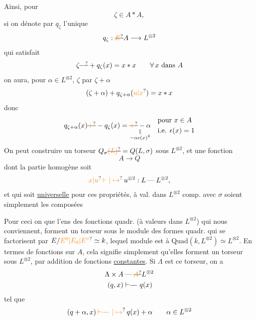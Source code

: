 Ainsi,  pour 
\[
\zeta\in A*A,
\]
si on dénote par $q_\zeta$ l'unique  
 
\[
q_\zeta:\deleted{\unsure{E}}A\longrightarrow L^{\otimes 2}
\]
qui satisfait
\[
\zeta\deleted{\unsure{-}}+q_\zeta(x)=x*x\qquad \forall\,x\text{ dans }A
\]
on aura, pour $\alpha\in L^{\otimes 2}$, 
$\zeta$ par $\zeta+\alpha$
\[
(\zeta+\alpha)+q_{\zeta+\alpha}(\unsure{u|x})=x*x
\]
donc
\[
q_{\zeta+\alpha}(x)\deleted{\unsure{+}}-q_\zeta(x)=
\underset{\substack{\Vert\\-\alpha\epsilon(x)^2}}{\deleted{\unsure{+}}-\alpha}
\quad\begin{aligned}&\text{pour }x\in A\\&\text{i.e. }\epsilon(x)=1\end{aligned}
\]
On peut construire un torseur
$Q_{\sigma}\deleted{\unsure{(L)}}=Q(L,\sigma)$ sous $L^{\otimes 2}$, et une fonction
\[
A\longrightarrow Q
\]
dont la partie homogène soit
\[
\unsure{x|u}\,\unsure{\vdash|\mapsto}\,u^{\otimes 2}:L\mathbin{\text{---}}L^{\otimes 2},
\]
et qui soit \uline{universelle} pour ces
propriétés, 
 à val. dans $L^{\otimes 2}$ comp. avec
$\sigma$ soient simplement les composées

Pour ceci on  que l'ens des
fonctions  quadr. (à valeurs dans $L^{\otimes 2}$)
qui nous conviennent, forment un
torseur sous le module des formes
quadr. qui se factorisent par
$E/\unsure{E^0|E_0|E^\circ}\simeq k$, lequel module est 
à $\mathrm{Quad}(k,L^{\otimes 2})\simeq L^{\otimes 2}$. En termes
de fonctions  sur $A$,
cela signifie simplement qu'elles
forment un torseur sous $L^{\otimes 2}$, par
addition de fonctions \uline{constantes}.
Si $\Lambda$ est ce torseur, on a
\[
\begin{aligned}
\Lambda\times A&\mathbin{\text{---}}\deleted{\unsure{A}}L^{\otimes 2}\\
(q,x)&\mathrel{\vdash\!\!-\!\!-}q(x)
\end{aligned}
\]
tel que
\[
(q+\alpha,x)\,\unsure{\mathrel{\vdash\!\!-\!\!-}|\mapsto}\,q(x)+\alpha\qquad\alpha\in L^{\otimes 2}
\]

